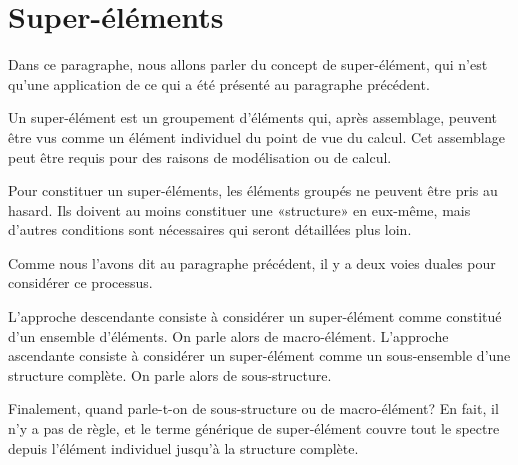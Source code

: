 \medskip
\section{Super-éléments}

Dans ce paragraphe, nous allons parler du concept de super-élément, qui n'est qu'une application de ce qui a été présenté au paragraphe précédent.

\medskip
Un super-élément est un groupement d'éléments qui, après assemblage, peuvent être vus comme un élément individuel du point de vue du calcul. Cet assemblage peut être requis pour des raisons de modélisation ou de calcul.

Pour constituer un super-éléments, les éléments groupés ne peuvent être pris au hasard. Ils doivent au moins constituer une «structure» en eux-même, mais d'autres conditions sont nécessaires qui seront détaillées plus loin.

Comme nous l'avons dit au paragraphe précédent, il y a deux voies duales pour considérer ce processus.

L'approche descendante consiste à considérer un super-élément comme constitué d'un ensemble d'éléments. On parle alors de macro-élément. L'approche ascendante consiste à considérer un super-élément comme un sous-ensemble d'une structure complète. On parle alors de sous-structure.

Finalement, quand parle-t-on de sous-structure ou de macro-élément? En fait, il n'y a pas de règle, et le terme générique de super-élément couvre tout le spectre depuis l'élément individuel jusqu'à la structure complète.

